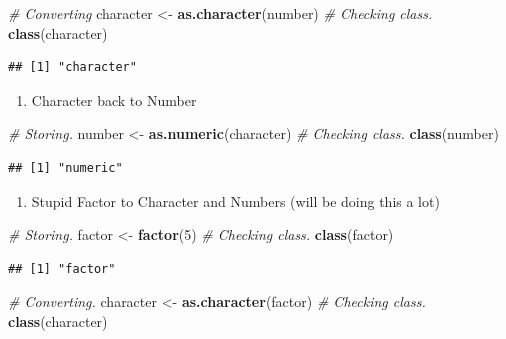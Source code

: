 \documentclass[]{book}
\newenvironment{Shaded}{\begin{snugshade}}{\end{snugshade}}
\newcommand{\CommentTok}[1]{\textcolor[rgb]{0.56,0.35,0.01}{\textit{#1}}}
\newcommand{\DecValTok}[1]{\textcolor[rgb]{0.00,0.00,0.81}{#1}}
\newcommand{\KeywordTok}[1]{\textcolor[rgb]{0.13,0.29,0.53}{\textbf{#1}}}
\newcommand{\NormalTok}[1]{#1}
\newcommand{\StringTok}[1]{\textcolor[rgb]{0.31,0.60,0.02}{#1}}
\providecommand{\tightlist}{%
  \setlength{\itemsep}{0pt}\setlength{\parskip}{0pt}}
\begin{document}
\begin{Shaded}
\begin{Highlighting}[]
\CommentTok{# Converting}
\NormalTok{character <-}\StringTok{ }\KeywordTok{as.character}\NormalTok{(number)}
\CommentTok{# Checking class.}
\KeywordTok{class}\NormalTok{(character)}
\end{Highlighting}
\end{Shaded}

\begin{verbatim}
## [1] "character"
\end{verbatim}

\begin{enumerate}
\def\labelenumi{\arabic{enumi}.}
\setcounter{enumi}{1}
\tightlist
\item
  Character back to Number
\end{enumerate}

\begin{Shaded}
\begin{Highlighting}[]
\CommentTok{# Storing.}
\NormalTok{number <-}\StringTok{ }\KeywordTok{as.numeric}\NormalTok{(character)}
\CommentTok{# Checking class.}
\KeywordTok{class}\NormalTok{(number)}
\end{Highlighting}
\end{Shaded}

\begin{verbatim}
## [1] "numeric"
\end{verbatim}

\begin{enumerate}
\def\labelenumi{\arabic{enumi}.}
\setcounter{enumi}{2}
\tightlist
\item
  Stupid Factor to Character and Numbers (will be doing this a lot)
\end{enumerate}

\begin{Shaded}
\begin{Highlighting}[]
\CommentTok{# Storing.}
\NormalTok{factor <-}\StringTok{ }\KeywordTok{factor}\NormalTok{(}\DecValTok{5}\NormalTok{)}
\CommentTok{# Checking class.}
\KeywordTok{class}\NormalTok{(factor)}
\end{Highlighting}
\end{Shaded}

\begin{verbatim}
## [1] "factor"
\end{verbatim}

\begin{Shaded}
\begin{Highlighting}[]
\CommentTok{# Converting.}
\NormalTok{character <-}\StringTok{ }\KeywordTok{as.character}\NormalTok{(factor)}
\CommentTok{# Checking class.}
\KeywordTok{class}\NormalTok{(character)}
\end{Highlighting}
\end{Shaded}
\end{document}
